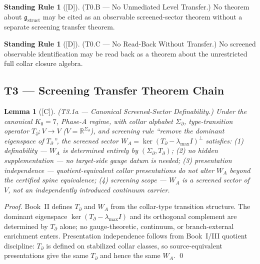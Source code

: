\documentclass[12pt,oneside]{amsbook}
\theoremstyle{plain}
\newtheorem{lemma}[theorem]{Lemma}
\theoremstyle{definition}
\newtheorem{standingrule}[theorem]{Standing Rule}
\theoremstyle{remark}
\newcommand{\status}[1]{\textup{[#1]}}
\begin{document}
\begin{standingrule}[\status{D}]\label{sr:T0B}
\textup{(T0.B --- No Unmediated Level Transfer.)}
No theorem about $\mathfrak{g}_{\mathrm{struct}}$ may be cited as an
observable screened-sector theorem without a separate screening
transfer theorem.
\end{standingrule}

\begin{standingrule}[\status{D}]\label{sr:T0C}
\textup{(T0.C --- No Read-Back Without Transfer.)}
No screened observable identification may be read back as a theorem
about the unrestricted full collar closure algebra.
\end{standingrule}

\subsection{T3 --- Screening Transfer Theorem Chain}

\begin{lemma}[\status{C}]\label{lem:T3-1a}
\textup{(T3.1a --- Canonical Screened-Sector Definability.)}
Under the canonical $K_0=7$, Phase-A regime, with collar alphabet
$\Sigma_\partial$, type-transition operator $T_\partial : V \to V$
($V = \mathbb{R}^{\Sigma_\partial}$), and screening rule ``remove the
dominant eigenspace of $T_\partial$'', the screened sector
$W_A = \ker(T_\partial - \lambda_{\max}I)^\perp$ satisfies:
\textup{(1)} definability --- $W_A$ is determined entirely by
$(\Sigma_\partial, T_\partial)$; \textup{(2)} no hidden supplementation
--- no target-side gauge datum is needed; \textup{(3)} presentation
independence --- quotient-equivalent collar presentations do not alter
$W_A$ beyond the certified spine equivalence; \textup{(4)} screening
scope --- $W_A$ is a screened sector of $V$, not an independently
introduced continuum carrier.
\end{lemma}

\begin{proof}
Book~II defines $T_\partial$ and $W_A$ from the collar-type transition
structure. The dominant eigenspace $\ker(T_\partial - \lambda_{\max}I)$
and its orthogonal complement are determined by $T_\partial$ alone; no
gauge-theoretic, continuum, or branch-external enrichment enters.
Presentation independence follows from Book~I/III quotient discipline:
$T_\partial$ is defined on stabilized collar classes, so
source-equivalent presentations give the same $T_\partial$ and hence
the same $W_A$. \qed
\end{proof}
\end{document}
